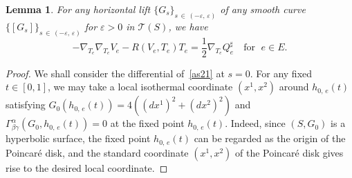 \documentclass[11pt]{article}
\newtheorem{lemm}[theo]{Lemma}
\theoremstyle{definition}
\numberwithin{equation}{section}
\newcommand{\e}{\varepsilon}
\newcommand{\Tc}{\mathcal{T}}
\begin{document}
\begin{lemm}\label{le3}
For any horizontal lift $\{G_s\}_{s\,\in\,(-\e,\,\e)}$ of any smooth curve \linebreak $\{[G_s]\}_{s\,\in\,(-\e,\,\e)}$ for $\e>0$ in $\Tc(S)$, we have
\[
-\nabla_{T_e}\nabla_{T_e}V_e-R\left(V_e, T_e\right)T_e=\frac{1}{2}\nabla_{T_e}Q_{e}^{\sharp} \quad \text{for }\; e \in E.
\]
\end{lemm}

\begin{proof}
We shall consider the differential of~\eqref{as21} at $s=0$. For any fixed $t \in [0, 1]$, we may take a local isothermal coordinate $(x^1,x^2)$ around $h_{0,\,e}(t)$ satisfying $G_0(h_{0,\,e}(t))=4((dx^1)^2+(dx^2)^2)$ and $\Gamma_{\beta\gamma}^{\alpha}(G_0, h_{0,\,e}(t))=0$ at the fixed point $h_{0,\,e}(t)$. Indeed, since $(S,G_0)$ is a hyperbolic surface, the fixed point $h_{0,\,e}(t)$ can be regarded as the origin of the Poincaré disk, and the standard coordinate $(x^1,x^2)$ of the Poincaré disk gives rise to the desired local coordinate.


\end{proof}
\end{document}
